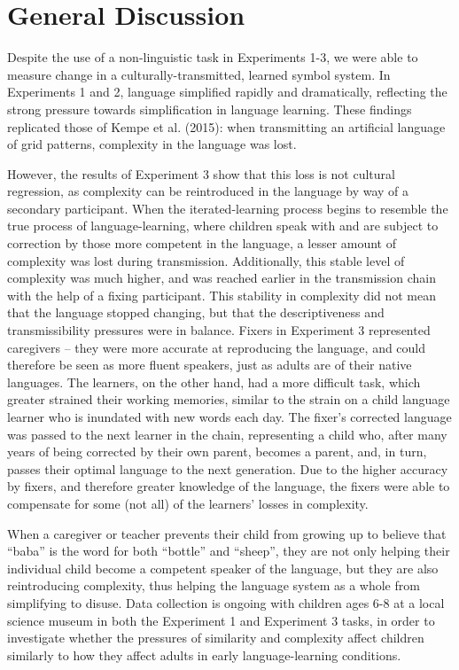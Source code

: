 \documentclass[10pt, letterpaper]{article}
\begin{document}
\hypertarget{general-discussion}{%
\section{General Discussion}\label{general-discussion}}

Despite the use of a non-linguistic task in Experiments 1-3, we were
able to measure change in a culturally-transmitted, learned symbol
system. In Experiments 1 and 2, language simplified rapidly and
dramatically, reflecting the strong pressure towards simplification in
language learning. These findings replicated those of Kempe et al.
(2015): when transmitting an artificial language of grid patterns,
complexity in the language was lost.

However, the results of Experiment 3 show that this loss is not cultural
regression, as complexity can be reintroduced in the language by way of
a secondary participant. When the iterated-learning process begins to
resemble the true process of language-learning, where children speak
with and are subject to correction by those more competent in the
language, a lesser amount of complexity was lost during transmission.
Additionally, this stable level of complexity was much higher, and was
reached earlier in the transmission chain with the help of a fixing
participant. This stability in complexity did not mean that the language
stopped changing, but that the descriptiveness and transmissibility
pressures were in balance. Fixers in Experiment 3 represented caregivers
-- they were more accurate at reproducing the language, and could
therefore be seen as more fluent speakers, just as adults are of their
native languages. The learners, on the other hand, had a more difficult
task, which greater strained their working memories, similar to the
strain on a child language learner who is inundated with new words each
day. The fixer's corrected language was passed to the next learner in
the chain, representing a child who, after many years of being corrected
by their own parent, becomes a parent, and, in turn, passes their
optimal language to the next generation. Due to the higher accuracy by
fixers, and therefore greater knowledge of the language, the fixers were
able to compensate for some (not all) of the learners' losses in
complexity.

When a caregiver or teacher prevents their child from growing up to
believe that ``baba'' is the word for both ``bottle'' and ``sheep'',
they are not only helping their individual child become a competent
speaker of the language, but they are also reintroducing complexity,
thus helping the language system as a whole from simplifying to disuse.
Data collection is ongoing with children ages 6-8 at a local science
museum in both the Experiment 1 and Experiment 3 tasks, in order to
investigate whether the pressures of similarity and complexity affect
children similarly to how they affect adults in early language-learning
conditions.
\end{document}
